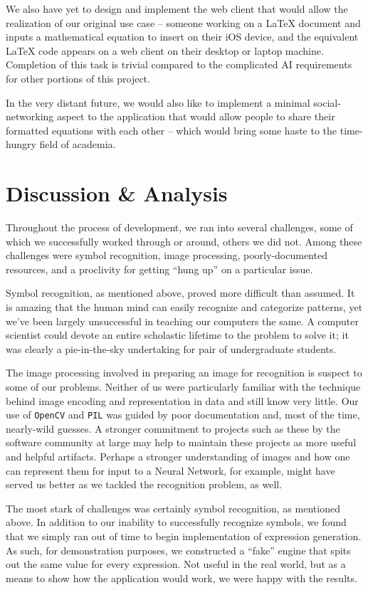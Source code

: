 \documentclass{acm_proc_article-sp}
\begin{document}
We also have yet to design and implement the web client that would allow the realization of our original use case -- someone working on a \LaTeX{}  document and inputs a mathematical equation to insert on their iOS device, and the equivalent \LaTeX{}  code appears on a web client on their desktop or laptop machine. Completion of this task is trivial compared to the complicated AI requirements for other portions of this project.

In the very distant future, we would also like to implement a minimal social-networking aspect to the application that would allow people to share their formatted equations with each other -- which would bring some haste to the time-hungry field of academia.

\section{Discussion \& Analysis}
Throughout the process of development, we ran into several challenges, some of which we successfully worked through or around, others we did not. Among these challenges were symbol recognition, image processing, poorly-documented resources, and a proclivity for getting ``hung up'' on a particular issue.

Symbol recognition, as mentioned above, proved more difficult than assumed. It is amazing that the human mind can easily recognize and categorize patterns, yet we've been largely unsuccessful in teaching our computers the same. A computer scientist could devote an entire scholastic lifetime to the problem to solve it; it was clearly a pie-in-the-sky undertaking for pair of undergraduate students.

The image processing involved in preparing an image for recognition is suspect to some of our problems. Neither of us were particularly familiar with the technique behind image encoding and representation in data and still know very little. Our use of \texttt{OpenCV} and \texttt{PIL} was guided by poor documentation and, most of the time, nearly-wild guesses. A stronger commitment to projects such as these by the software community at large may help to maintain these projects as more useful and helpful artifacts. Perhaps a stronger understanding of images and how one can represent them for input to a Neural Network, for example, might have served us better as we tackled the recognition problem, as well.

The most stark of challenges was certainly symbol recognition, as mentioned above. In addition to our inability to successfully recognize symbols, we found that we simply ran out of time to begin implementation of expression generation. As such, for demonstration purposes, we constructed a ``fake'' engine that spits out the same value for every expression. Not useful in the real world, but as a means to show how the application would work, we were happy with the results.
\end{document}
